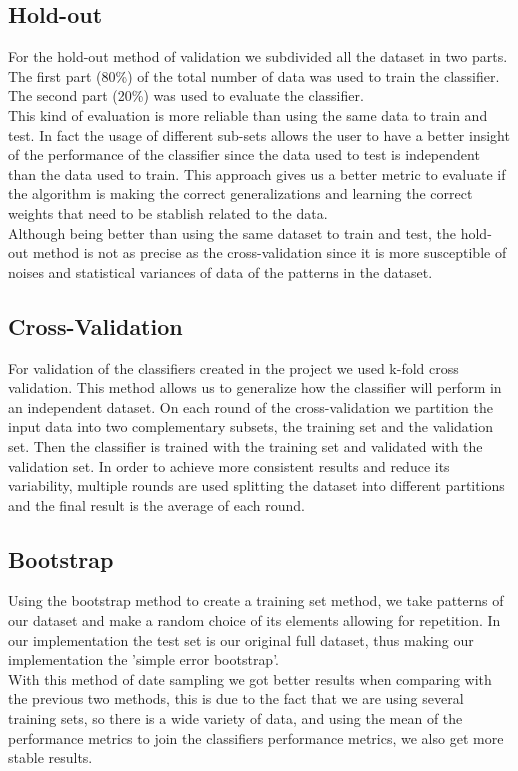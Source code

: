 \documentclass[english, a4paper, 12pt]{article}
\newcommand{\tab}{\hspace*{2em}}
\begin{document}
\subsection{Hold-out}
\tab For the hold-out method of validation we subdivided all the dataset in two parts. The first part (80\%) of the total number of data was used to train the classifier. The second part (20\%) was used to evaluate the classifier.\\
\tab This kind of evaluation is more reliable than using the same data to train and test. In fact the usage of different sub-sets allows the user to have a better insight of the performance of the classifier since the data used to test is independent than the data used to train. This approach gives us a better metric to evaluate if the algorithm is making the correct generalizations and learning the correct weights that need to be stablish related to the data.\\
\tab Although being better than using the same dataset to train and test, the hold-out method is not as precise as the cross-validation since it is more susceptible of noises and statistical variances of data of the patterns in the dataset. 
\subsection{Cross-Validation}
\tab For validation of the classifiers created in the project we used k-fold cross validation. This method allows us to generalize how the classifier will perform in an independent dataset. On each round of the cross-validation we partition the input data into two complementary subsets, the training set and the validation set. Then the classifier is trained with the training set and validated with the validation set. In order to achieve more consistent results and reduce its variability, multiple rounds are used splitting the dataset into different partitions and the final result is the average of each round.\\
\subsection{Bootstrap}
\tab Using the bootstrap method to create a training set method, we take patterns of our dataset and make a random choice of its elements allowing for repetition. In our implementation the test set is our original full dataset, thus making our implementation the 'simple error bootstrap'.\\
\tab With this method of date sampling we got better results when comparing with the previous two methods, this is due to the fact that we are using several training sets, so there is a wide variety of data, and using the mean of the performance metrics to join the classifiers performance metrics, we also get more stable results.
\end{document}
